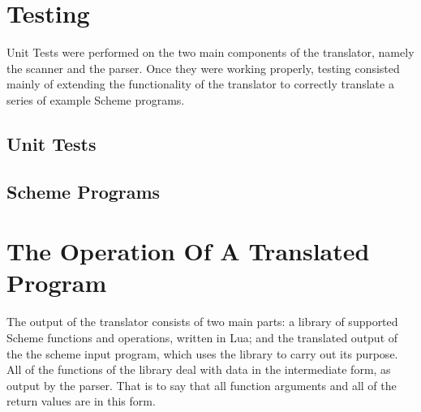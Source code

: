 \section{Testing}

Unit Tests were performed on the two main components of the translator, namely
the scanner and the parser. Once they were working properly, testing consisted
mainly of extending the functionality of the translator to correctly translate a
series of example Scheme programs.

\subsection{Unit Tests}

\subsection{Scheme Programs}


\section{The Operation Of A Translated Program}

The output of the translator consists of two main parts: a library of supported
Scheme functions and operations, written in Lua; and the translated output of
the the scheme input program, which uses the library to carry out its purpose.
All of the functions of the library deal with data in the intermediate form, as
output by the parser. That is to say that all function arguments and all of the
return values are in this form.
